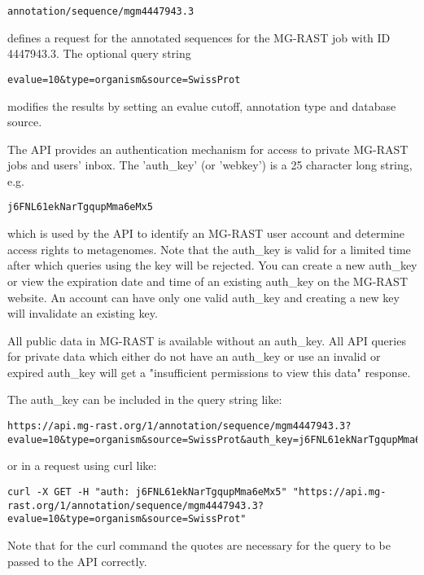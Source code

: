 \begin{small}
\begin{verbatim}
annotation/sequence/mgm4447943.3
\end{verbatim}
\end{small} defines a request for the annotated sequences for the MG-RAST job with ID 4447943.3.
The optional query string

\begin{small}
\begin{verbatim}
evalue=10&type=organism&source=SwissProt
\end{verbatim}
\end{small} modifies the results by setting an evalue cutoff, annotation type and database source.

The API provides an authentication mechanism for access to private MG-RAST jobs and users' inbox. The 'auth\_key' (or 'webkey') is a 25 character long string, e.g.

\begin{small}
\begin{verbatim}
j6FNL61ekNarTgqupMma6eMx5
\end{verbatim}
\end{small} which is used by the API to identify an MG-RAST user account and determine access rights to metagenomes. Note that the auth\_key is valid for a limited time after which queries using the key will be rejected. You can create a new auth\_key or view the expiration date and time of an existing auth\_key on the MG-RAST website. An account can have only one valid auth\_key and creating a new key will invalidate an existing key.

All public data in MG-RAST is available without an auth\_key. All API queries for private data which either do not have an auth\_key or use an invalid or expired auth\_key will get a "insufficient permissions to view this data" response.

The auth\_key can be included in the query string like:
\begin{small}
\begin{lstlisting}
https://api.mg-rast.org/1/annotation/sequence/mgm4447943.3?evalue=10&type=organism&source=SwissProt&auth_key=j6FNL61ekNarTgqupMma6eMx5
\end{lstlisting}
\end{small} or in a request using curl like:
\begin{small}
\begin{lstlisting}
curl -X GET -H "auth: j6FNL61ekNarTgqupMma6eMx5" "https://api.mg-rast.org/1/annotation/sequence/mgm4447943.3?evalue=10&type=organism&source=SwissProt"
\end{lstlisting}
\end{small} Note that for the curl command the quotes are necessary for the query to be passed to the API correctly.

